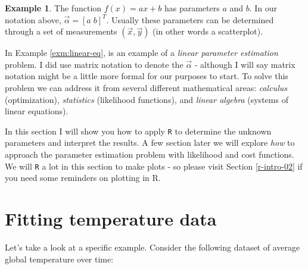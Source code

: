 \documentclass[
]{book}
\theoremstyle{definition}
\theoremstyle{definition}
\newtheorem{example}{Example}[chapter]
\theoremstyle{definition}
\theoremstyle{remark}
\begin{document}
\begin{example}
\protect\hypertarget{exm:linear-eq}{}{\label{exm:linear-eq} }The function \(f(x)=ax+b\) has parameters \(a\) and \(b\). In our notation above, \(\displaystyle \vec{\alpha} = [a \; b]^{T}\). Usually these parameters can be determined through a set of measurements \((\vec{x},\vec{y})\) (in other words a scatterplot).
\end{example}

In Example \ref{exm:linear-eq}, is an example of a \emph{linear parameter estimation} problem. I did use matrix notation to denote the \(\vec{\alpha}\) - although I will say matrix notation might be a little more formal for our purposes to start. To solve this problem we can address it from several different mathematical areas: \emph{calculus} (optimization), \emph{statistics} (likelihood functions), and \emph{linear algebra} (systems of linear equations).

In this section I will show you how to apply \texttt{R} to determine the unknown parameters and interpret the results. A few section later we will explore \emph{how} to approach the parameter estimation problem with likelihood and cost functions. We will \texttt{R} a lot in this section to make plots - so please visit Section \ref{r-intro-02} if you need some reminders on plotting in R.

\hypertarget{fitting-temperature-data}{%
\section{Fitting temperature data}\label{fitting-temperature-data}}

Let's take a look at a specific example. Consider the following dataset of average global temperature over time:\\
\end{document}
